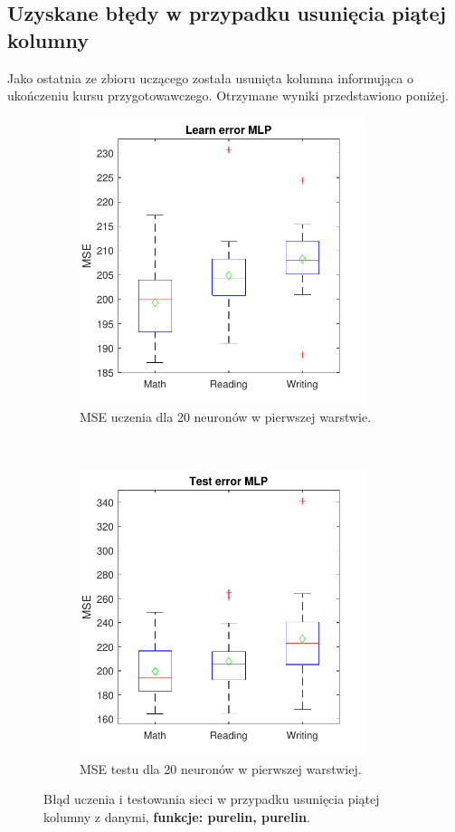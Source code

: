 \documentclass[12pt]{article}
\begin{document}
\subsection{Uzyskane błędy w przypadku usunięcia piątej kolumny}
Jako ostatnia ze zbioru uczącego została usunięta kolumna informująca o ukończeniu kursu przygotowawczego. Otrzymane wyniki przedstawiono poniżej.
\begin{figure}[H]
\centering
\begin{subfigure}[t]{0.48\textwidth} 
\centering
\includegraphics[height=3.3in]{purelin_purelin_20_without_5_learnBoxplot.pdf}
\caption{MSE uczenia dla  20 neuronów w pierwszej warstwie.}
\end{subfigure}
~~
\begin{subfigure}[t]{0.48\textwidth} 
\centering
\includegraphics[height=3.3in]{purelin_purelin_20_without_5_testBoxplot.pdf}
\caption{MSE testu dla  20  neuronów w pierwszej warstwiej.}
\end{subfigure}

\caption{Błąd uczenia i testowania sieci w przypadku usunięcia piątej  kolumny z danymi, \textbf{funkcje: purelin, purelin}.} 
\end{figure}
\end{document}
